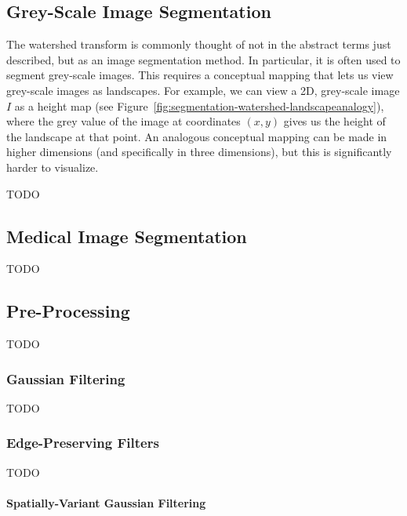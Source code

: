 
\subsection{Grey-Scale Image Segmentation}

The watershed transform is commonly thought of not in the abstract terms just described, but as an image segmentation method. In particular, it is often used to segment grey-scale images. This requires a conceptual mapping that lets us view grey-scale images as landscapes. For example, we can view a 2D, grey-scale image $I$ as a height map (see Figure~\ref{fig:segmentation-watershed-landscapeanalogy}), where the grey value of the image at coordinates $(x,y)$ gives us the height of the landscape at that point. An analogous conceptual mapping can be made in higher dimensions (and specifically in three dimensions), but this is significantly harder to visualize.


TODO

\subsection{Medical Image Segmentation}

TODO

\subsection{Pre-Processing}

TODO

\subsubsection{Gaussian Filtering}

TODO

\subsubsection{Edge-Preserving Filters}

TODO

\paragraph{Spatially-Variant Gaussian Filtering}

